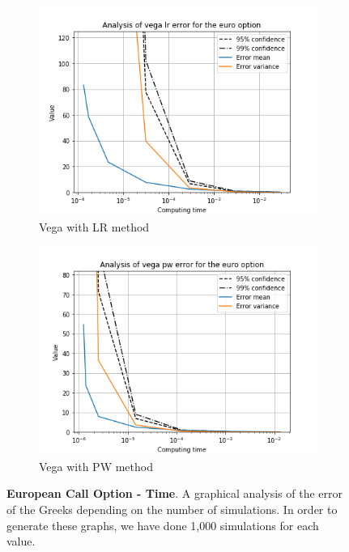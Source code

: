 \documentclass[11pt,a4paper,fleqn]{article}
\begin{document}
\begin{figure}[h!]
      \begin{subfigure}[b]{0.45\textwidth}
          \includegraphics[width=\textwidth]{graphs/eurovegalrtime.png}
          \caption{Vega with LR method}
      \end{subfigure}
      \begin{subfigure}[b]{0.45\textwidth}
          \includegraphics[width=\textwidth]{graphs/eurovegapwtime.png}
          \caption{Vega with PW method}
      \end{subfigure}

      \caption{\textbf{European Call Option - Time}. A graphical analysis of the error of the Greeks depending on the number of simulations. In order to generate these graphs, we have done 1,000 simulations for each value.}
\end{figure}
\end{document}
